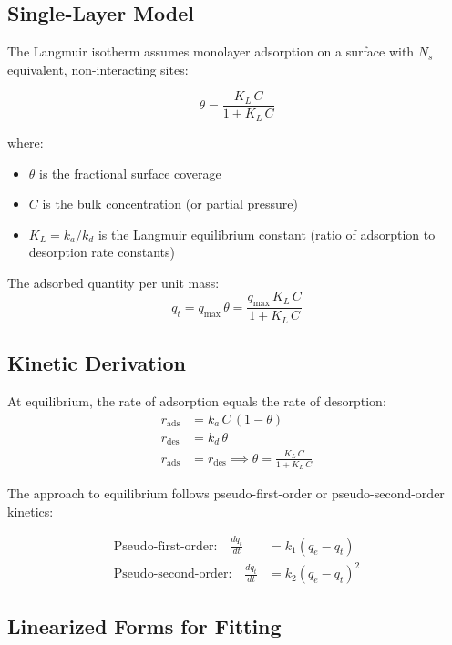 \documentclass[11pt]{article}
\begin{document}
\subsection{Single-Layer Model}

The Langmuir isotherm assumes monolayer adsorption on a surface with
$N_s$ equivalent, non-interacting sites:

\begin{equation}
  \theta = \frac{K_L\, C}{1 + K_L\, C}
\end{equation}

where:
\begin{itemize}
  \item $\theta$ is the fractional surface coverage
  \item $C$ is the bulk concentration (or partial pressure)
  \item $K_L = k_a / k_d$ is the Langmuir equilibrium constant
        (ratio of adsorption to desorption rate constants)
\end{itemize}

The adsorbed quantity per unit mass:
\begin{equation}
  q_t = q_{\max}\, \theta = \frac{q_{\max}\, K_L\, C}{1 + K_L\, C}
\end{equation}

\subsection{Kinetic Derivation}

At equilibrium, the rate of adsorption equals the rate of desorption:
\begin{align}
  r_{\text{ads}} &= k_a\, C\, (1 - \theta) \\
  r_{\text{des}} &= k_d\, \theta \\
  r_{\text{ads}} &= r_{\text{des}}
  \implies \theta = \frac{K_L\, C}{1 + K_L\, C}
\end{align}

The approach to equilibrium follows pseudo-first-order or
pseudo-second-order kinetics:

\begin{align}
  \text{Pseudo-first-order:} \quad
    \frac{dq_t}{dt} &= k_1 (q_e - q_t) \\
  \text{Pseudo-second-order:} \quad
    \frac{dq_t}{dt} &= k_2 (q_e - q_t)^2
\end{align}

\subsection{Linearized Forms for Fitting}
\end{document}
